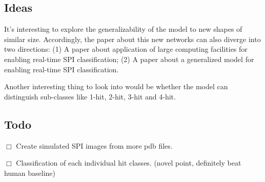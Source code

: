 {

    \subsection*{Ideas}

    It's interesting to explore the generalizability of the model to new shapes
    of similar size.  Accordingly, the paper about this new networks can also
    diverge into two directions: (1) A paper about application of large
    computing facilities for enabling real-time SPI classification; (2) A paper
    about a generalized model for enabling real-time SPI classification.

    Another interesting thing to look into would be whether the model can
    distinguish sub-classes like 1-hit, 2-hit, 3-hit and 4-hit.  

    \subsection*{Todo}

    $\Box$ Create simulated SPI images from more pdb files.

    $\Box$ Classification of each individual hit classes.  (novel point,
    definitely beat human baseline)

}
